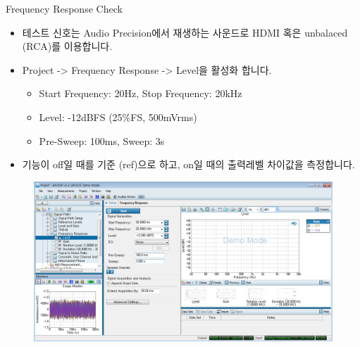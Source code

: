 \documentclass{beamer}
\begin{document}
\begin{frame}[t]{Frequency Response Check}
\begin{itemize}
\item 테스트 신호는 Audio Precision에서 재생하는 사운드로 HDMI 혹은 unbalaced (RCA)를 이용합니다.
\item Project -> Frequency Response -> Level을 활성화 합니다.
	\begin{itemize}
	\item Start Frequency: 20Hz, Stop Frequency: 20kHz
	\item Level: -12dBFS (25\%FS, 500mVrms)
	\item Pre-Sweep: 100ms, Sweep: 3s
	\end{itemize}
\item 기능이 off일 때를 기준 (ref)으로 하고, on일 때의 출력레벨 차이값을 측정합니다.
\end{itemize}

\begin{figure}[r]
\includegraphics[height=0.4\textwidth]{figure/apsetting/frequencyResponse.png}
\end{figure}

\end{frame}
\end{document}
